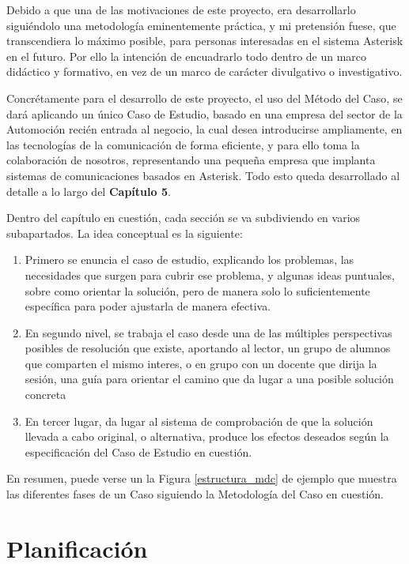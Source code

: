 Debido a que una de las motivaciones de este proyecto, era desarrollarlo siguiéndolo una metodología eminentemente práctica, y mi pretensión fuese, que transcendiera lo máximo posible, para personas interesadas en el sistema Asterisk en el futuro. Por ello la intención de encuadrarlo todo dentro de un marco didáctico y formativo, en vez de un marco de carácter divulgativo o investigativo.

Concrétamente para el desarrollo de este proyecto, el uso del Método del Caso, se dará aplicando un único Caso de Estudio, basado en una empresa del sector de la Automoción recién entrada al negocio, la cual desea introducirse ampliamente, en las tecnologías de la comunicación de forma eficiente, y para ello toma la colaboración de nosotros, representando una pequeña empresa que implanta sistemas de comunicaciones basados en Asterisk. Todo esto queda desarrollado al detalle a lo largo del \textbf{Capítulo 5}.

Dentro del capítulo en cuestión, cada sección se va subdiviendo en varios subapartados. La idea conceptual es la siguiente:


\begin{enumerate}
	\item Primero se enuncia el caso de estudio, explicando los problemas, las necesidades que surgen para cubrir ese problema, y algunas ideas puntuales, sobre como orientar la solución, pero de manera solo lo suficientemente específica para poder ajustarla de manera efectiva.
	\item En segundo nivel, se trabaja el caso desde una de las múltiples perspectivas posibles de resolución que existe, aportando al lector, un grupo de alumnos que comparten el mismo interes, o en grupo con un docente que dirija la sesión, una guía para orientar el camino que da lugar a una posible solución concreta
	\item En tercer lugar, da lugar al sistema de comprobación de que la solución llevada a cabo original, o alternativa, produce los efectos deseados según la especificación del Caso de Estudio en cuestión.
\end{enumerate}

En resumen, puede verse un la Figura \ref{estructura_mdc} de ejemplo que muestra las diferentes fases de un Caso siguiendo la Metodología del Caso en cuestión.


\section{Planificación}

